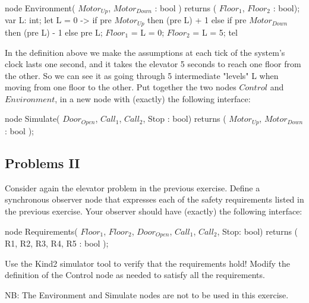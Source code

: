 \documentclass[11pt]{article}
\begin{document}
\begin{lustre}
node Environment( $Motor_{Up}$, $Motor_{Down}$ : bool )
   returns ( $Floor_1$, $Floor_2$ : bool);
var L: int;
let
  L = 0 -> if pre $Motor_{Up}$ then (pre L) + 1
           else if pre $Motor_{Down}$ then (pre L) - 1
           else pre L;
  $Floor_1$ =  L = 0;
  $Floor_2$ =  L = 5;
tel
\end{lustre}

In the definition above we make the assumptions at each tick of the
system's clock lasts one second, and it takes the elevator 5 seconds
to reach one floor from the other. So we can see it as going through 5
intermediate "levels" L when moving from one floor to the other.  Put
together the two nodes $Control$ and $Environment$, in a new node with
(exactly) the following interface:

\begin{lustre}
node Simulate( $Door_{Open}$, $Call_1$, $Call_2$, Stop : bool)
   returns ( $Motor_{Up}$, $Motor_{Down}$ : bool );
\end{lustre}



\subsection{Problems II}

Consider again the elevator problem in the previous exercise.  Define
a synchronous observer node that expresses each of the safety
requirements listed in the previous exercise. Your observer should
have (exactly) the following interface:

\begin{lustre}
node Requirements( $Floor_1$, $Floor_2$, $Door_{Open}$, $Call_1$, $Call_2$, Stop: bool)
   returns ( R1, R2, R3, R4, R5 : bool );
\end{lustre}

Use the Kind2 simulator tool to verify that the requirements hold!
Modify the definition of the Control node as needed to satisfy all the
requirements.

NB: The Environment and Simulate nodes are not to be used in this
exercise.
\end{document}
